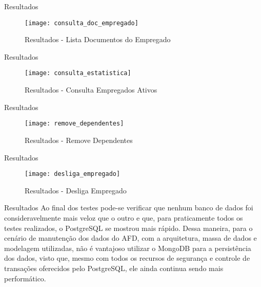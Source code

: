 \begin{frame}{Resultados}
\begin{figure}[!htbp]
	\begin{center}
		\texttt{[image: consulta\_doc\_empregado]}
	\end{center}
	\caption{Resultados - Lista Documentos do Empregado}
	\label{fig:resultlistadocempregado}
\end{figure}
\end{frame}

\begin{frame}{Resultados}
\begin{figure}[!htbp]
	\begin{center}
		\texttt{[image: consulta\_estatistica]}
	\end{center}
	\caption{Resultados - Consulta Empregados Ativos}
	\label{fig:resultlistaempregadosativos}
\end{figure}
\end{frame}

\begin{frame}{Resultados}
\begin{figure}[!htbp]
	\begin{center}
		\texttt{[image: remove\_dependentes]}
	\end{center}
	\caption{Resultados - Remove Dependentes}
	\label{fig:resultremovedependentes}
\end{figure}
\end{frame}

\begin{frame}{Resultados}
\begin{figure}[!htbp]
	\begin{center}
		\texttt{[image: desliga\_empregado]}
	\end{center}
	\caption{Resultados - Desliga Empregado}
	\label{fig:resultdesliga_empregado}
\end{figure}
\end{frame}

\begin{frame}{Resultados}
Ao final dos testes pode-se verificar que nenhum banco de dados foi consideravelmente mais veloz que o outro e que, para praticamente todos os testes realizados, o PostgreSQL se mostrou mais rápido. Dessa maneira, para o cenário de manutenção dos dados do AFD, com a arquitetura, massa de dados e modelagem utilizadas, não é vantajoso utilizar o MongoDB para a persistência dos dados, visto que, mesmo com todos os recursos de segurança e controle de transações oferecidos pelo PostgreSQL, ele ainda continua sendo mais performático.
\end{frame}

